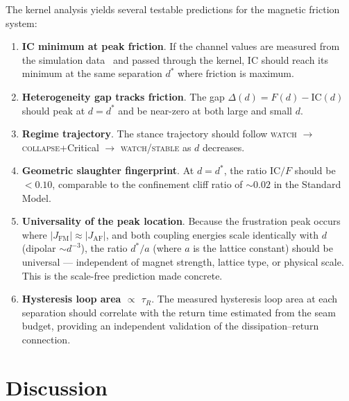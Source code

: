 \documentclass[
  aps,
  prd,
  twocolumn,
  superscriptaddress,
  nofootinbib,
  floatfix
]{revtex4-2}
\newcommand{\tR}{\tau_{\!R}}
\newcommand{\regime}[1]{\textrm{\upshape\scshape#1}}
\newcommand{\IC}{\mathrm{IC}}
\newcommand{\AF}{\mathrm{AF}}
\newcommand{\FM}{\mathrm{FM}}
\begin{document}
The kernel analysis yields several testable predictions
for the magnetic friction system:

\begin{enumerate}[nosep]
  \item \textbf{IC minimum at peak friction}.
    If the channel values are measured from the simulation
    data~\cite{gu2026data} and passed through the kernel,
    IC should reach its minimum at the same separation $d^*$
    where friction is maximum.

  \item \textbf{Heterogeneity gap tracks friction}.
    The gap $\Delta(d) = F(d) - \IC(d)$ should peak
    at $d = d^*$ and be near-zero at both large and
    small $d$.

  \item \textbf{Regime trajectory}.
    The stance trajectory should follow
    \regime{watch} $\to$ \regime{collapse}+Critical
    $\to$ \regime{watch}/\regime{stable} as $d$
    decreases.

  \item \textbf{Geometric slaughter fingerprint}.
    At $d = d^*$, the ratio $\IC/F$ should be
    $< 0.10$, comparable to the confinement cliff
    ratio of $\sim 0.02$ in the Standard Model.

  \item \textbf{Universality of the peak location}.
    Because the frustration peak occurs where
    $|J_{\FM}| \approx |J_{\AF}|$, and both
    coupling energies scale identically with $d$
    (dipolar $\sim d^{-3}$), the ratio
    $d^*/a$ (where $a$ is the lattice constant)
    should be universal --- independent of magnet
    strength, lattice type, or physical scale.
    This is the scale-free prediction made concrete.

  \item \textbf{Hysteresis loop area $\propto$ $\tR$}.
    The measured hysteresis loop area at each
    separation should correlate with the return
    time estimated from the seam budget, providing
    an independent validation of the dissipation--return
    connection.
\end{enumerate}

\section{Discussion}\label{sec:discussion}
\end{document}
